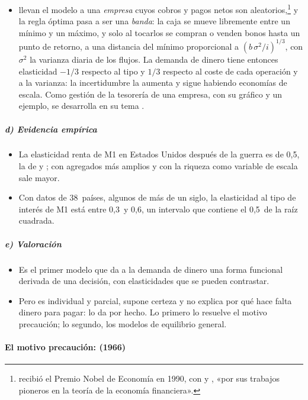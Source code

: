 \documentclass[11pt]{article}
\begin{document}
\begin{itemize}
\item \textcite{MillerOrr1966Model} llevan el modelo a una \emph{empresa} cuyos cobros y pagos netos son aleatorios,\footnote{ recibió el Premio Nobel de Economía en 1990, con  y , «por sus trabajos pioneros en la teoría de la economía financiera»\nocite{Nobel1990Markowitz}.} y la regla óptima pasa a ser una \emph{banda}: la caja se mueve libremente entre un mínimo y un máximo, y solo al tocarlos se compran o venden bonos hasta un punto de retorno, a una distancia del mínimo proporcional a $(b\,\sigma^2/i)^{1/3}$, con $\sigma^2$ la varianza diaria de los flujos. La demanda de dinero tiene entonces elasticidad $-1/3$ respecto al tipo y $1/3$ respecto al coste de cada operación y a la varianza: la incertidumbre la aumenta y sigue habiendo economías de escala. Como gestión de la tesorería de una empresa, con su gráfico y un ejemplo, se desarrolla en su tema .
\end{itemize}

\subparagraph{d) Evidencia empírica}

\begin{itemize}
\item La elasticidad renta de M1 en Estados Unidos después de la guerra es de 0,5\nocite{Ball2001Another}, la de  y ; con agregados más amplios y con la riqueza como variable de escala sale mayor\nocite{KnellStix2005Income}.
\item Con datos de 38~países, algunos de más de un siglo, la elasticidad al tipo de interés de M1 está entre 0,3~y 0,6, un intervalo que contiene el 0,5~de la raíz cuadrada\nocite{BenatiLucasNicoliniWeber2021}.
\end{itemize}

\subparagraph{e) Valoración}

\begin{itemize}
\item Es el primer modelo que da a la demanda de dinero una forma funcional derivada de una decisión, con elasticidades que se pueden contrastar.
\item Pero es individual y parcial, supone certeza y no explica por qué hace falta dinero para pagar: lo da por hecho. Lo primero lo resuelve el motivo precaución; lo segundo, los modelos de equilibrio general.
\end{itemize}

\paragraph{El motivo precaución:  (1966)}
\end{document}
